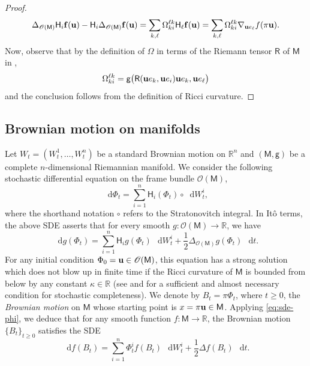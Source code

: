 \documentclass[a4paper,twoside,11pt,reqno]{amsart}
\newcommand*\diff{\mathop{}\!\mathrm{d}}
\newcommand{\R}{\mathbb{R}} %
\newcommand{\li}{\bf }
\newcommand{\MM}{\mathsf{M}}
\newcommand{\GG}{\mathsf{g}}
\newcommand{\ms}{\mathscr}
\newcommand{\msf}{\mathsf}
\newcommand{\HH}{\mathsf{H}}
\begin{document}
\begin{proof}
\begin{equation}
\Delta_{\ms{O}(\MM)} \HH_i {\li f}({\bf u}) - \HH_i \Delta_{\ms{O}(\MM)} {\li f}({\bf u}) = \sum_{k,\ell} \Omega_{ki}^{\ell k} \HH_\ell {\li f}({\bf u}) = \sum_{k,\ell} \Omega_{ki}^{\ell k} \nabla_{{\bf u}e_\ell} f(\pi {\bf u}).
\end{equation}
Now, observe that by the definition of $\Omega$ in terms of the Riemann tensor $\msf{R}$ of $\MM$ in \cite[p.~149]{Hsu02},
\begin{equation}
\Omega_{ki}^{\ell k} = \GG\big( \msf{R}({\bf u}e_k, {\bf u}e_i) {\bf u}e_k, {\bf u}e_\ell\big)
\end{equation}
and the conclusion follows from the definition of Ricci curvature.
\end{proof}



\subsection{Brownian motion on manifolds} Let $W_t=(W_t^1,\ldots,W_t^n)$ be a standard Brownian motion on $\R^n$ and $(\MM, \GG)$ be a complete $n$-dimensional Riemannian manifold. We consider the following stochastic differential equation on the frame bundle $\ms{O}(\MM)$,
\begin{equation} \label{eq:bm}
\diff\Phi_t = \sum_{i=1}^n \HH_i (\Phi_t) \circ \diff W_t^i,
\end{equation}
where the shorthand notation $\circ$ refers to the Stratonovitch integral. In It\^o terms, the above SDE asserts that for every smooth $g:\ms{O}(\MM)\to\R$, we have
\begin{equation} \label{eq:sde-phi}
\diff g(\Phi_t) = \sum_{i=1}^n \HH_ig(\Phi_t)\, \diff W_t^i  + \frac{1}{2} \Delta_{\ms{O}(\MM)}g(\Phi_t)\, \diff t.
\end{equation}
For any initial condition $\Phi_0 = {\bf u}\in\ms{O}(\MM)$, this equation has a strong solution which does not blow up in finite time if the Ricci curvature of $\MM$ is bounded from below by any constant $\kappa\in\R$ (see \cite[Theorem~4.2.4]{Hsu02} and \cite{Var83} for a sufficient and almost necessary condition for stochastic completeness). We denote by $B_t = \pi\Phi_t$, where $t\geq0$, the {\it Brownian motion} on $\MM$ whose starting point is $x=\pi{\bf u}\in \MM$. Applying \eqref{eq:sde-phi}, we deduce that for any smooth function $f:\MM\to\R$, the Brownian motion $\{B_t\}_{t\geq0}$ satisfies the SDE
\begin{equation}
\diff f(B_t) = \sum_{i=1}^n \Phi_t^i f(B_t)\, \diff W_t^i + \frac{1}{2} \Delta f(B_t)\,\diff t.
\end{equation}
\end{document}
